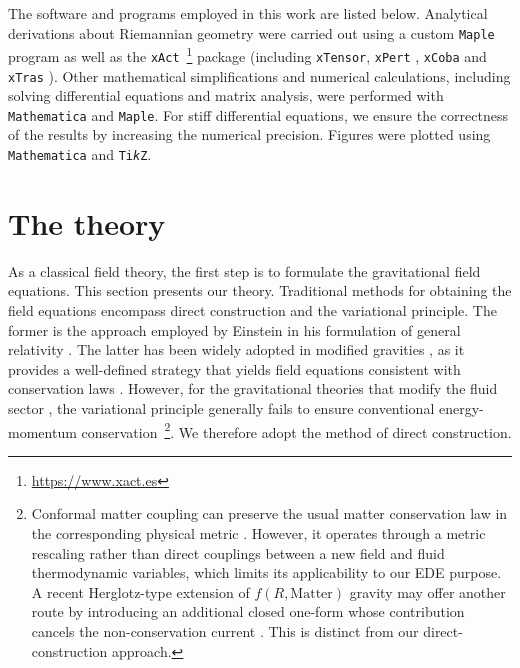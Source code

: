\documentclass[aps,prd,twocolumn]{revtex4-2}
\begin{document}
The software and programs employed in this work are listed below. Analytical derivations about Riemannian geometry were carried out using a custom \texttt{Maple} program \cite{Tian2020} as well as the \texttt{xAct}~\footnote{\url{https://www.xact.es}} package (including \texttt{xTensor}, \texttt{xPert} \cite{Brizuela2008.GenRelativGravit.41.2415}, \texttt{xCoba} and \texttt{xTras} \cite{Nutma2013.ComputPhysCommun.185.1719}). Other mathematical simplifications and numerical calculations, including solving differential equations and matrix analysis, were performed with \texttt{Mathematica} and \texttt{Maple}. For stiff differential equations, we ensure the correctness of the results by increasing the numerical precision. Figures were plotted using \texttt{Mathematica} and \texttt{Ti\textit{k}Z}.


\section{The theory}\label{sec:II}
As a classical field theory, the first step is to formulate the gravitational field equations. This section presents our theory. Traditional methods for obtaining the field equations encompass direct construction and the variational principle. The former is the approach employed by Einstein in his formulation of general relativity \cite{Einstein1916.NotEngJ.354.769}. The latter has been widely adopted in modified gravities \cite{Brans1961.PhysRev.124.925,Buchdahl1970.MNRAS.150.1,Horndeski1974.IntJTheorPhys.10.363}, as it provides a well-defined strategy that yields field equations consistent with conservation laws \cite{Bargmann1957.RMP.29.161,Bekenstein2004.PRD.70.083509}. However, for the gravitational theories that modify the fluid sector \cite{Sotiriou2008.CQG.25.205002,Harko2010.EurPhysJC.70.373,Harko2011.PRD.84.024020,Pinto2022.PRD.106.044043,Tian2023.PRD.107.103507}, the variational principle generally fails to ensure conventional energy-momentum conservation~\footnote{Conformal matter coupling can preserve the usual matter conservation law in the corresponding physical metric \cite{Damour1992.CQG.9.2093}. However, it operates through a metric rescaling rather than direct couplings between a new field and fluid thermodynamic variables, which limits its applicability to our EDE purpose. A recent Herglotz-type extension of $f(R,\mathrm{Matter})$ gravity may offer another route by introducing an additional closed one-form whose contribution cancels the non-conservation current \cite{TamasGeza2026}. This is distinct from our direct-construction approach.}. We therefore adopt the method of direct construction.
\end{document}
